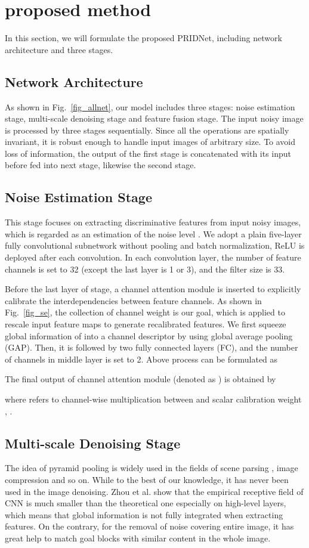 \documentclass[conference]{IEEEtran}
\begin{document}
\section{proposed method}
In this section, we will formulate the proposed PRIDNet, including network architecture and three stages.
\subsection{Network Architecture}
As shown in Fig.~\ref{fig_allnet}, our model includes three stages: noise estimation stage, multi-scale denoising stage and feature fusion stage. The input noisy image is processed by three stages sequentially. Since all the operations are spatially invariant, it is robust enough to handle input images of arbitrary size.
To avoid loss of information, the output of the first stage is concatenated with its input before fed into next stage, likewise the second stage.
\subsection{Noise Estimation Stage}
This stage focuses on extracting discriminative features from input noisy images, which is regarded as an estimation of the noise level \cite{CBDNet}. We adopt a plain five-layer fully convolutional subnetwork without pooling and batch normalization, ReLU is deployed after each convolution. In each convolution layer, the number of feature channels is set to 32 (except the last layer is 1 or 3), and the filter size is 33.

Before the last layer of stage, a channel attention module \cite{Luyue} is inserted to explicitly calibrate the interdependencies between feature channels. As shown in Fig.~\ref{fig_se}, the collection of channel weight  is our goal, which is applied to rescale input feature maps  to generate recalibrated features. We first squeeze global information of  into a channel descriptor  by using global average pooling (GAP). Then, it is followed by two fully connected layers (FC), and the number of channels in middle layer is set to 2. Above process can be formulated as

The final output of channel attention module (denoted as ) is obtained by

where  refers to channel-wise multiplication between  and scalar calibration weight , .
\subsection{Multi-scale Denoising Stage}
The idea of pyramid pooling is widely used in the fields of scene parsing \cite{pspnet}, image compression and so on. While to the best of our knowledge, it has never been used in the image denoising. Zhou et al. \cite{zhou} show that the empirical receptive field of CNN is much smaller than the theoretical one especially on high-level layers, which means that global information is not fully integrated when extracting features. On the contrary, for the removal of noise covering entire image, it has great help to match goal blocks with similar content in the whole image.
\end{document}
